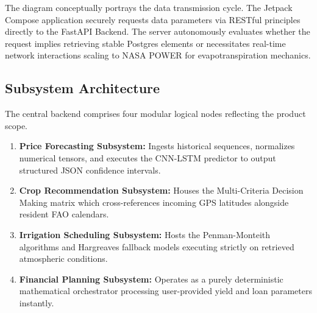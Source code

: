 The diagram conceptually portrays the data transmission cycle. The Jetpack Compose application securely requests data parameters via RESTful principles directly to the FastAPI Backend. The server autonomously evaluates whether the request implies retrieving stable Postgres elements or necessitates real-time network interactions scaling to NASA POWER for evapotranspiration mechanics.

\subsection{Subsystem Architecture}
The central backend comprises four modular logical nodes reflecting the product scope. 
\begin{enumerate}
    \item \textbf{Price Forecasting Subsystem:} Ingests historical sequences, normalizes numerical tensors, and executes the CNN-LSTM predictor to output structured JSON confidence intervals.
    \item \textbf{Crop Recommendation Subsystem:} Houses the Multi-Criteria Decision Making matrix which cross-references incoming GPS latitudes alongside resident FAO calendars.
    \item \textbf{Irrigation Scheduling Subsystem:} Hosts the Penman-Monteith algorithms and Hargreaves fallback models executing strictly on retrieved atmospheric conditions.
    \item \textbf{Financial Planning Subsystem:} Operates as a purely deterministic mathematical orchestrator processing user-provided yield and loan parameters instantly.
\end{enumerate}

